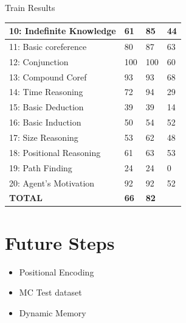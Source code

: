 \documentclass[pdf]{beamer}
\begin{document}
\begin{frame}{Train Results}
\begin{table}[]
{\begin{tabular}{|l|l|l|l|}
10: Indefinite Knowledge & 61                                                             & 85                                                              & 44       \\ \hline
11: Basic coreference    & 80                                                             & 87                                                              & 63       \\ \hline
12: Conjunction          & 100                                                            & 100                                                             & 60       \\ \hline
13: Compound Coref       & 93                                                             & 93                                                              & 68       \\ \hline
14: Time Reasoning       & 72                                                             & 94                                                              & 29       \\ \hline
15: Basic Deduction      & 39                                                             & 39                                                              & 14       \\ \hline
16: Basic Induction      & 50                                                             & 54                                                              & 52       \\ \hline
17: Size Reasoning       & 53                                                             & 62                                                              & 48       \\ \hline
18: Positional Reasoning & 61                                                             & 63                                                              & 53       \\ \hline
19: Path Finding         & 24                                                             & 24                                                              & 0        \\ \hline
20: Agent's Motivation   & 92                                                             & 92                                                              & 52       \\ \hline
\textbf{TOTAL}           & \textbf{66}                                                    & \textbf{82}                                                     &          \\ \hline
\end{tabular}
}
\end{table}
\end{frame}


\section{Future Steps}

\begin{frame}
\begin{itemize}
	\item Positional Encoding
	\item MC Test dataset
	\item Dynamic Memory
\end{itemize}
\end{frame}
\end{document}
